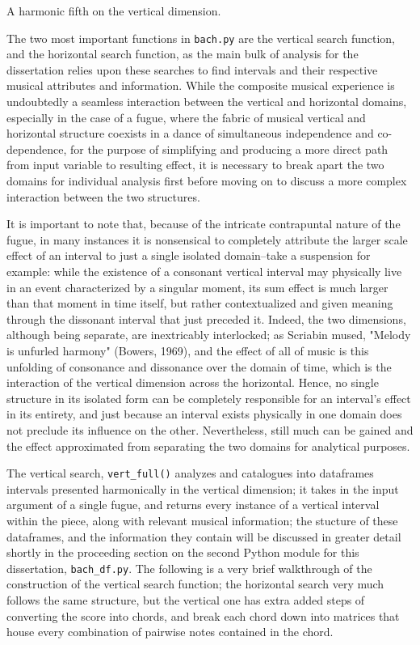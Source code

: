 \begin{Example}[H]
\vspace{1.5em}
    \centering
    \caption{ A harmonic fifth on the vertical dimension. }
\end{Example}    
    The two most important functions in \texttt{bach.py} are the vertical
search function, and the horizontal search function, as the main bulk of
analysis for the dissertation relies upon these searches to find
intervals and their respective musical attributes and information. While
the composite musical experience is undoubtedly a seamless interaction
between the vertical and horizontal domains, especially in the case of a
fugue, where the fabric of musical vertical and horizontal structure
coexists in a dance of simultaneous independence and co-dependence, for
the purpose of simplifying and producing a more direct path from input
variable to resulting effect, it is necessary to break apart the two
domains for individual analysis first before moving on to discuss a more
complex interaction between the two structures.

It is important to note that, because of the intricate contrapuntal
nature of the fugue, in many instances it is nonsensical to completely
attribute the larger scale effect of an interval to just a single
isolated domain--take a suspension for example: while the existence of
a consonant vertical interval may physically live in an event
characterized by a singular moment, its sum effect is much larger than
that moment in time itself, but rather contextualized and given meaning
through the dissonant interval that just preceded it. Indeed, the two
dimensions, although being separate, are inextricably interlocked; as
Scriabin mused, "Melody is unfurled harmony" (Bowers, 1969), and the
effect of all of music is this unfolding of consonance and dissonance
over the domain of time, which is the interaction of the vertical
dimension across the horizontal. Hence, no single structure in its
isolated form can be completely responsible for an interval's effect in
its entirety, and just because an interval exists physically in one
domain does not preclude its influence on the other. Nevertheless, still
much can be gained and the effect approximated from separating the two
domains for analytical purposes.

The vertical search, \texttt{vert\_full()} analyzes and catalogues into
dataframes intervals presented harmonically in the vertical dimension;
it takes in the input argument of a single fugue, and returns every
instance of a vertical interval within the piece, along with relevant
musical information; the stucture of these dataframes, and the
information they contain will be discussed in greater detail shortly in
the proceeding section on the second Python module for this
dissertation, \texttt{bach\_df.py}. The following is a very brief
walkthrough of the construction of the vertical search function; the
horizontal search very much follows the same structure, but the vertical
one has extra added steps of converting the score into chords, and break
each chord down into matrices that house every combination of pairwise
notes contained in the chord.

